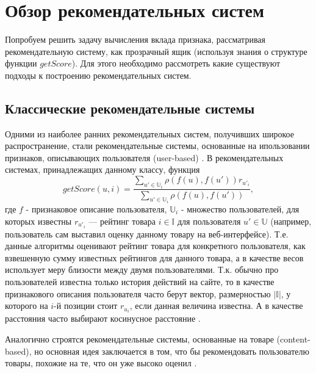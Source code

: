 \documentclass[12pt,a4paper]{report}
\begin{document}
\section{Обзор рекомендательных систем}
Попробуем решить задачу вычисления вклада признака, рассматривая рекомендательную систему, как прозрачный ящик (используя знания о структуре функции $getScore$). Для этого необходимо рассмотреть какие существуют подходы к построению рекомендательных систем.

\subsection{Классические рекомендательные системы}
Одними из наиболее ранних рекомендательных систем, получивших широкое распространение, стали рекомендательные системы,
 основанные на ипользовании признаков, описывающих пользователя (user-based) \cite{Ubrs}. В рекомендательных системах, принадлежащих данному классу, функция
\begin{equation*}
getScore(u, i) = \frac{\sum_{u' \in \mathbb{U}_i} \rho(f(u), f(u')) r_{u'_i}}{\sum_{u' \in \mathbb{U}_i} \rho(f(u), f(u')) },
\end{equation*}
где $f$ - признаковое описание пользователя, $\mathbb{U}_i$ -  множество пользователей, для которых известны $r_{u'_i}$ --- рейтинг товара $i \in \mathbb{I} $ для пользователя $u' \in \mathbb{U}$ (например, пользователь сам выставил оценку данному товару на веб-интерфейсе). Т.е. данные алгоритмы оценивают рейтинг товара для конкретного пользователя, как взвешенную сумму известных рейтингов для данного товара, а в качестве весов использует меру близости между двумя пользователями. Т.к. обычно про пользователей известна только история действий на сайте, то в качестве признакового описания пользователя часто берут вектор, размерностью $|\mathbb{I}|$, у которого на $i$-й позиции стоит $r_{u_i}$, если данная величина известна. А в качестве расстояния часто выбирают косинусное расстояние \cite{Cos}.

Аналогично строятся рекомендательные системы, основанные на товаре (content-based), но основная идея заключается в том, что бы рекомендовать пользователю товары, похожие на те, что он уже высоко оценил \cite{Cbrs}.
\end{document}
